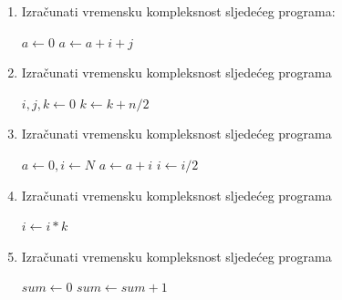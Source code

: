 \begin{enumerate}
	\item Izračunati vremensku kompleksnost sljedećeg programa:
	
	\begin{algorithm}[H]
		\begin{algorithmic}[1]
		    \State $ a \gets  0$
		    		\State $a \gets  a + i + j$
		         \EndFor
		     \EndFor	    
		\end{algorithmic}
	\end{algorithm}
\item Izračunati vremensku kompleksnost sljedećeg programa 
	\begin{algorithm}[H]
	\begin{algorithmic}[1]
		\State $i, j, k \gets  0$
				\State $k \gets  k + n / 2$
			\EndFor
		\EndFor
	\end{algorithmic}
\end{algorithm}
 \item Izračunati vremensku kompleksnost sljedećeg programa 

	\begin{algorithm}[H]
	\begin{algorithmic}[1]
		\State $a \gets 0, i \gets N$
			\State $a \gets a+ i$
			\State $i \gets i / 2$
		\EndWhile
		 
	\end{algorithmic}
\end{algorithm}
 \item Izračunati vremensku kompleksnost sljedećeg programa 

\begin{algorithm}[H]
	\begin{algorithmic}[1]
		    \State $i \gets i * k$
		\EndFor
	\end{algorithmic}
\end{algorithm}

 \item Izračunati vremensku kompleksnost sljedećeg programa 

\begin{algorithm}[H]
	\begin{algorithmic}[1]
	  \State $sum \gets 0$
                      \State	$sum \gets sum + 1$
                 

\end{algorithmic}
\end{algorithm}
\end{enumerate}
